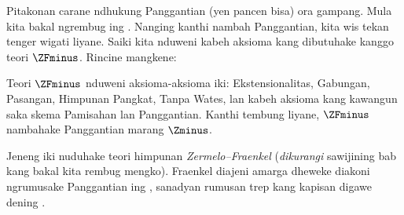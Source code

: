 \documentclass[../../../include/open-logic-section]{subfiles}
\begin{document}

Pitakonan carane ndhukung Panggantian (yen pancen bisa)
ora gampang. Mula kita bakal ngrembug ing
. Nanging kanthi nambah
Panggantian, kita wis tekan tenger wigati liyane.
Saiki kita nduweni kabeh aksioma kang dibutuhake
kanggo teori $\ZFminus$. Rincine mangkene:

\begin{defn}
Teori $\ZFminus$ nduweni aksioma-aksioma iki:
Ekstensionalitas, Gabungan, Pasangan, Himpunan Pangkat,
Tanpa Wates, lan kabeh aksioma kang kawangun saka skema Pamisahan lan
Panggantian. Kanthi tembung liyane, $\ZFminus$
nambahake Panggantian marang $\Zminus$.
\end{defn}
\noindent
Jeneng iki nuduhake teori himpunan
\emph{Zermelo--Fraenkel} (\emph{dikurangi} sawijining
bab kang bakal kita rembug mengko). Fraenkel diajeni
amarga dheweke diakoni ngrumusake Panggantian ing
\citeyear{Fraenkel1922}, sanadyan rumusan trep kang
kapisan digawe dening \citet{Skolem1922}.
\end{document}
